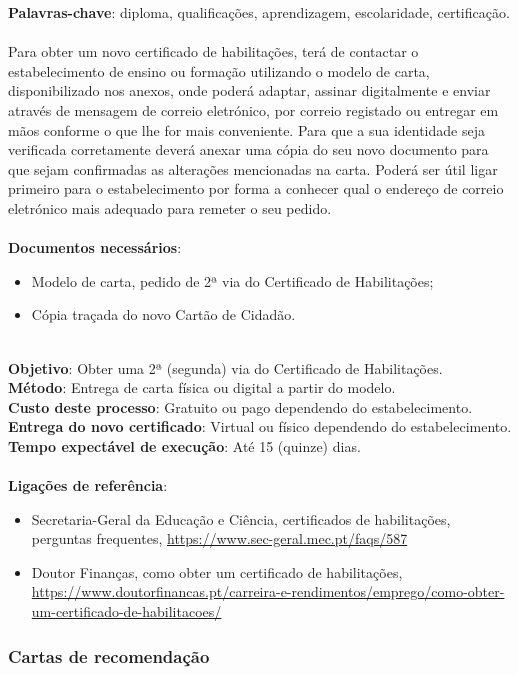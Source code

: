 \textbf{Palavras-chave}: diploma, qualificações, aprendizagem, escolaridade, certificação. \\
\\
Para obter um novo certificado de habilitações, terá de contactar o
estabelecimento de ensino ou formação utilizando o modelo de carta,
disponibilizado nos anexos, onde poderá adaptar, assinar digitalmente e
enviar através de mensagem de correio eletrónico, por correio registado
ou entregar em mãos conforme o que lhe for mais conveniente. Para que a
sua identidade seja verificada corretamente deverá anexar uma cópia do
seu novo documento para que sejam confirmadas as alterações mencionadas
na carta. Poderá ser útil ligar primeiro para o estabelecimento por
forma a conhecer qual o endereço de correio eletrónico mais adequado
para remeter o seu pedido. \\
\\
\textbf{Documentos necessários}:
\begin{itemize}
	\item Modelo de carta, pedido de 2ª via do Certificado de Habilitações;
	\item Cópia traçada do novo Cartão de Cidadão.
\end{itemize}
\leavevmode\\
\textbf{Objetivo}: Obter uma 2ª (segunda) via do Certificado de Habilitações. \\
\textbf{Método}: Entrega de carta física ou digital a partir do modelo. \\
\textbf{Custo deste processo}: Gratuito ou pago dependendo do estabelecimento. \\
\textbf{Entrega do novo certificado}: Virtual ou físico dependendo do estabelecimento. \\
\textbf{Tempo expectável de execução}: Até 15 (quinze) dias. \\
\\
\textbf{Ligações de referência}:
\begin{itemize}
	\item Secretaria-Geral da Educação e Ciência, certificados de habilitações, perguntas frequentes, \url{https://www.sec-geral.mec.pt/faqs/587}
	\item Doutor Finanças, como obter um certificado de habilitações, \url{https://www.doutorfinancas.pt/carreira-e-rendimentos/emprego/como-obter-um-certificado-de-habilitacoes/}
\end{itemize}

\subsubsection{Cartas de recomendação}

